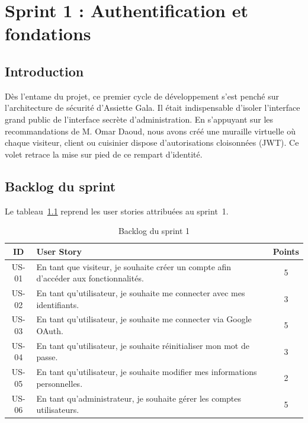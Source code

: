\chapter{Sprint 1 : Authentification et fondations}

\section{Introduction}

Dès l'entame du projet, ce premier cycle de développement s'est penché sur l'architecture de sécurité d'Assiette Gala. Il était indispensable d'isoler l'interface grand public de l'interface secrète d'administration. En s'appuyant sur les recommandations de M. Omar Daoud, nous avons créé une muraille virtuelle où chaque visiteur, client ou cuisinier dispose d'autorisations cloisonnées (JWT). Ce volet retrace la mise sur pied de ce rempart d'identité.

\section{Backlog du sprint}

Le tableau~\ref{tab:backlog_sprint1} reprend les user stories attribuées au sprint~1.

\begin{table}[H]
    \centering
    \caption{Backlog du sprint 1}
    \label{tab:backlog_sprint1}
    \renewcommand{\arraystretch}{1.3}
    \begin{tabular}{|c|p{8cm}|c|}
        \hline
        \textbf{ID} & \textbf{User Story} & \textbf{Points} \\
        \hline
        US-01 & En tant que visiteur, je souhaite créer un compte afin d'accéder aux fonctionnalités. & 5 \\
        \hline
        US-02 & En tant qu'utilisateur, je souhaite me connecter avec mes identifiants. & 3 \\
        \hline
        US-03 & En tant qu'utilisateur, je souhaite me connecter via Google OAuth. & 5 \\
        \hline
        US-04 & En tant qu'utilisateur, je souhaite réinitialiser mon mot de passe. & 3 \\
        \hline
        US-05 & En tant qu'utilisateur, je souhaite modifier mes informations personnelles. & 2 \\
        \hline
        US-06 & En tant qu'administrateur, je souhaite gérer les comptes utilisateurs. & 5 \\
        \hline
    \end{tabular}
\end{table}

